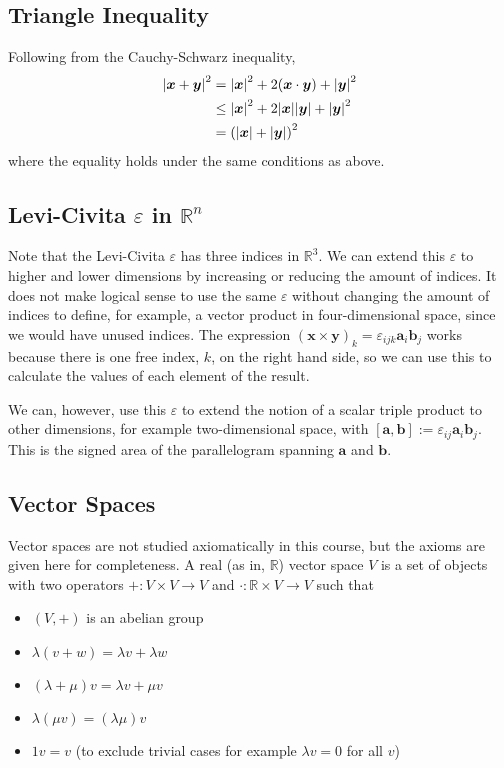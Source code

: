 \documentclass{article}
\begin{document}
	\subsection{Triangle Inequality}
	Following from the Cauchy-Schwarz inequality,
	\begin{align*}
		\abs{\bm x + \bm y}^2
		&= \abs{\bm x}^2 + 2(\bm x \cdot \bm y) + \abs{\bm y}^2 \\
		&\leq \abs{\bm x}^2 + 2 \abs{\bm x}\abs{\bm y} + \abs{\bm y}^2 \\
		&= \left(\abs{\bm x} + \abs{\bm y}\right)^2
	\end{align*}
	where the equality holds under the same conditions as above.
	
	\subsection{Levi-Civita $\varepsilon$ in $\mathbb R^n$}
	Note that the Levi-Civita $\varepsilon$ has three indices in $\mathbb R^3$. We can extend this $\varepsilon$ to higher and lower dimensions by increasing or reducing the amount of indices. It does not make logical sense to use the same $\varepsilon$ without changing the amount of indices to define, for example, a vector product in four-dimensional space, since we would have unused indices. The expression $(\bm x \times \bm y)_k = \varepsilon_{ijk} \bm a_i \bm b_j$ works because there is one free index, $k$, on the right hand side, so we can use this to calculate the values of each element of the result.
	
	We can, however, use this $\varepsilon$ to extend the notion of a scalar triple product to other dimensions, for example two-dimensional space, with $[\bm a, \bm b] := \varepsilon_{ij} \bm a_i \bm b_j$. This is the signed area of the parallelogram spanning $\bm a$ and $\bm b$.
	
	\subsection{Vector Spaces}
	Vector spaces are not studied axiomatically in this course, but the axioms are given here for completeness. A real (as in, $\mathbb R$) vector space $V$ is a set of objects with two operators $+: V \times V \to V$ and $\cdot: \mathbb R \times V \to V$ such that
	\begin{itemize}
		\item $(V, +)$ is an abelian group
		\item $\lambda(v + w) = \lambda v + \lambda w$
		\item $(\lambda + \mu)v = \lambda v + \mu v$
		\item $\lambda(\mu v) = (\lambda \mu) v$
		\item $1v = v$ (to exclude trivial cases for example $\lambda v = 0$ for all $v$)
	\end{itemize}
\end{document}
